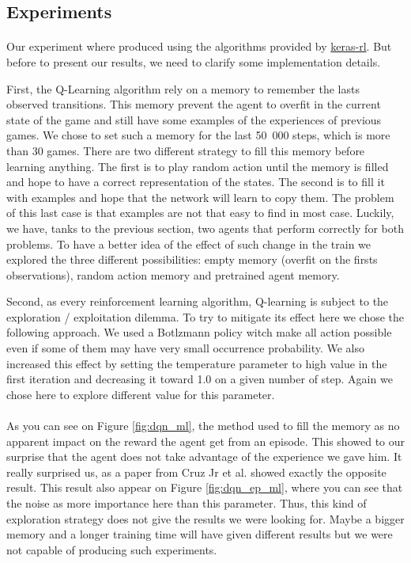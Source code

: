 \documentclass[twocolumn,a4paper,10pt]{article}
\begin{document}
\subsection{Experiments}

\paragraph{}

Our experiment where produced using the algorithms provided by \href{https://github.com/keras-rl/keras-rl}{keras-rl}.
But before to present our results, we need to clarify some implementation
details.

First, the Q-Learning algorithm rely on a memory to remember the lasts
observed transitions. This memory prevent the agent to overfit in
the current state of the game and still have some examples of the
experiences of previous games. We chose to set such a memory for the
last 50~000 steps, which is more than 30 games. There are two different
strategy to fill this memory before learning anything. The first is
to play random action until the memory is filled and hope to have
a correct representation of the states. The second is to fill it with
examples and hope that the network will learn to copy them. The problem
of this last case is that examples are not that easy to find in most
case. Luckily, we have, tanks to the previous section, two agents
that perform correctly for both problems. To have a better idea of
the effect of such change in the train we explored the three different
possibilities: empty memory (overfit on the firsts observations), random
action memory and pretrained agent memory.

Second, as every reinforcement learning algorithm, Q-learning is subject
to the exploration / exploitation dilemma. To try to mitigate its effect here
we chose the following approach. We used a Botlzmann policy witch
make all action possible even if some of them may have very small
occurrence probability. We also increased this effect by setting the
temperature parameter to high value in the first iteration and decreasing
it toward 1.0 on a given number of step. Again we chose here to explore
different value for this parameter.

\paragraph{}

As you can see on Figure \ref{fig:dqn_ml}, the method used to fill
the memory as no apparent impact on the reward the agent get from
an episode. This showed to our surprise that the agent does not take advantage
of the experience we gave him. It really surprised us, as a paper
from Cruz Jr et al. \cite{DQNpretraining} showed exactly the opposite
result. This result also appear on Figure \ref{fig:dqn_ep_ml}, where
you can see that the noise as more importance here than this parameter.
Thus, this kind of exploration strategy does not give the results
we were looking for. Maybe a bigger memory and a longer training time
will have given different results but we were not capable of producing
such experiments.
\end{document}
